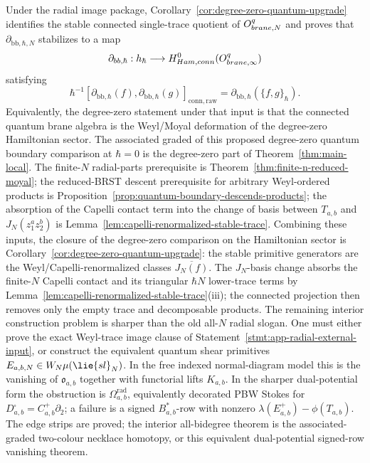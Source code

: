 \documentclass[11pt]{memoir}
\begin{document}
\begin{rmk}\label{rmk:quantum-hamiltonian-upgrade}
  Under the radial image package,
  Corollary~\ref{cor:degree-zero-quantum-upgrade} identifies the stable
  connected single-trace quotient of
  $O^{q}_{brane,N}$ and proves that
  $\partial_{\mathrm{bb},\hbar,N}$ stabilizes to a map
  $$\partial_{bb,\hbar}:h_\hbar\longrightarrow
    H^0_{Ham,conn}(O^{q}_{brane,\infty})$$
  satisfying
  $$\hbar^{-1}[\partial_{\mathrm{bb},\hbar}(f),
      \partial_{\mathrm{bb},\hbar}(g)]_{\mathrm{conn,raw}}
    =\partial_{\mathrm{bb},\hbar}(\{f,g\}_\hbar).$$
  Equivalently, the degree-zero statement under that input is that the
  connected quantum brane algebra is the Weyl/Moyal deformation of the
  degree-zero Hamiltonian sector.  The associated graded of this proposed
  degree-zero quantum boundary comparison at $\hbar=0$ is the
  degree-zero part of Theorem~\ref{thm:main-local}.
  The finite-$N$ radial-parts prerequisite is
  Theorem~\ref{thm:finite-n-reduced-moyal}; the reduced-BRST descent
  prerequisite for arbitrary Weyl-ordered products is
  Proposition~\ref{prop:quantum-boundary-descends-products}; the absorption of
  the Capelli contact term into the change of basis between $T_{a,b}$ and
  $J_N(z_1^az_2^b)$ is Lemma~\ref{lem:capelli-renormalized-stable-trace}.
  Combining these inputs, the closure of the degree-zero comparison on the
  Hamiltonian sector is Corollary~\ref{cor:degree-zero-quantum-upgrade}: the
  stable primitive generators are the Weyl/Capelli-renormalized classes
  $\overline{J_N(f)}$.  The \(J_N\)-basis change absorbs the finite-\(N\)
  Capelli contact and its triangular \(\hbar N\) lower-trace terms by
  Lemma~\ref{lem:capelli-renormalized-stable-trace}(iii); the connected
  projection then removes only the empty trace and decomposable products.
  The remaining interior construction problem is sharper than the old
  all-\(N\) radial slogan.  One must either prove the exact Weyl-trace
  image clause of Statement~\ref{stmt:app-radial-external-input}, or
  construct the equivalent quantum shear primitives
  \(E_{a,b,N}\in\mathcal W_N\widehat\mu(\lie{sl}_N)\).  In the free
  indexed normal-diagram model this is the vanishing of
  \(\mathfrak o_{a,b}\) together with functorial lifts \(K_{a,b}\).  In
  the sharper dual-potential form the obstruction is
  \(\Omega^{\mathrm{rad}}_{a,b}\), equivalently decorated PBW Stokes for
  \(D^\square_{a,b}=C^+_{a,b}\partial_2\); a failure is a signed
  \(B_{a,b}^*\)-row with nonzero
  \(\lambda(E^+_{a,b})-\phi(T_{a,b})\).  The edge strips are proved; the
  interior all-bidegree theorem is the associated-graded two-colour
  necklace homotopy, or this equivalent dual-potential signed-row
  vanishing theorem.
\end{rmk}
\end{document}
